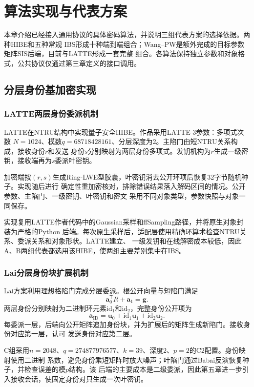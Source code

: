 \chapter{算法实现与代表方案}

本章介绍已经接入通用协议的具体密码算法，并说明三组代表方案的选择依据。两种HIBE和五种常规
IBS形成十种端到端组合；Wang--PW是额外完成的目标参数矩阵SIS后端，目前与LATTE形成一套完整
组合。各算法保持独立参数和对象格式，公共协议仅通过第三章定义的接口调用。

\section{分层身份基加密实现}

\subsection{LATTE两层身份委派机制}

LATTE在NTRU结构中实现量子安全HIBE\cite{zhao2024latte}。作品采用LATTE-3参数：多项式次数
$N=1024$、模数$q=68718428161$、分层深度为2。主陷门由短NTRU关系构成，接收身份$r$和发送
身份$s$分别映射为两层身份多项式。发钥机构为$r$生成一级密钥，接收端再为$s$委派叶密钥。

加密端按$(r,s)$生成Ring-LWE型胶囊，叶密钥消去公开环项后恢复32字节随机种子。实现随后进行
确定性重加密核对，排除错误结果落入解码区间的情况。公开参数、主陷门、一级密钥、叶密钥和密文
采用不同对象类型，参数快照与对象一同保存。

实现复用LATTE作者代码中的Gaussian采样和ffSampling路径，并将原生对象封装为严格的Python
后端。每次原生采样后，适配层使用精确环算术检查NTRU关系、委派关系和对象形状。LATTE建立、
一级发钥和在线解密成本较低，因此A、B两组代表都选用该HIBE，使两组主要差别集中在IBS。

\subsection{Lai分层身份块扩展机制}

Lai方案利用理想格陷门完成分层委派\cite{lai2015trapdoors}。根公开向量与短陷门满足
\[
 \mathbf a_0^{\mathsf T}R+\mathbf a_1=\mathbf g.
\]
两层身份分别映射为二进制环元素$\mathrm{id}_1$和$\mathrm{id}_2$，完整身份公开项为
\[
 \mathbf a_{\mathrm{ID}}
 =\mathbf u_0+\mathrm{id}_1\mathbf u_1+\mathrm{id}_2\mathbf u_2.
\]
每委派一层，后端向公开矩阵追加身份块，并为扩展后的矩阵生成新陷门。接收身份对应第一层，认可
发送身份对应第二层。

C组采用$n=2048$、$q=274877976577$、$k=39$、深度2、$p=2$的C2配置。身份映射使用二进制
系数，避免身份乘短矩阵时放大噪声；叶陷门通过Babai反演恢复种子，并检查误差的模$p$结构。该
后端的主要成本是二级委派，因此第五章进一步引入接收会话，使固定身份对只生成一次叶密钥。

